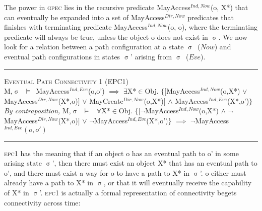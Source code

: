 \documentclass[a4paper,11pt, twoside,twocolumn]{article}
\newenvironment{logic}[1][]
{\begin{flushleft} \small }
{\end{flushleft}}
\newcommand{\loin}{$\in$}
\newcommand{\loforall}{$\forall$}
\newcommand{\loexists}{$\exists$}
\newcommand{\loand}{$\land$}
\newcommand{\loor} {$\lor$}
\newcommand{\loimplies}{$\implies$}
\newcommand{\losigma}{$\upsigma$}
\newcommand{\loturns} {$\vDash$}
\newcommand{\loneg}{$\boldsymbol \neg$}
\newcommand{\ablock} {\null\qquad}
\begin{document}
The power in \textsc{gpec} lies in the recursive predicate MayAccess$^{Ind,Now}$(o, X*) that can eventually be expanded into a set of MayAccess$^{Dir,Now}$ predicates that finishes with terminating predicate MayAccess$^{Ind,Now}$(o, o), where the terminating predicate will always be true, unless the object o does not exist in \losigma.
We now look for a relation between a path configuration at a state \losigma\ ($Now$) and eventual path configurations in states \losigma' arising from \losigma\ ($Eve$).\vfill
\begin{minipage}[b]{\linewidth}
\begin{logic}
\hrule\null
\textsc{\normalsize *Eventual Path Connectivity 1 (EPC1)}\\
M,\losigma\ \loturns\ MayAccess$^{Ind,Eve}$(o,o')\linebreak
\ablock \loimplies\linebreak
\ablock \loexists X*\loin Obj. $\{[$MayAccess$^{Ind,Now}$(o,X*)\linebreak
\ablock \ablock \ablock \ablock\loor \linebreak
\ablock \ablock \ablock \quad\: MayAccess$^{Dir,Now}$(X*,o)$]$\linebreak
\ablock \ablock \ablock \ablock\loor \linebreak
\ablock \ablock \ablock \quad\: MayCreate$^{Dir,Now}$(o,X*)$]$\linebreak
\ablock \ablock \ablock \quad \loand \linebreak
\ablock \ablock \ablock \quad MayAccess$^{Ind,Eve}$(X*,o')$\}$
\linebreak \\
\textit{By contraposition,}\linebreak
M,\losigma\ \loturns\ \linebreak
\ablock \loforall X*\loin Obj. $\{[$\loneg MayAccess$^{Ind,Now}$(o,X*)\linebreak
\ablock \ablock \ablock \ablock \quad \loand \linebreak
\ablock \ablock \ablock \quad\: \loneg MayAccess$^{Dir,Now}$(X*,o)$]$\linebreak
\ablock \ablock \ablock \quad \loor \linebreak
\ablock \ablock \ablock \quad \loneg MayAccess$^{Ind,Eve}$(X*,o')$\}$\linebreak
\ablock \loimplies\linebreak
	\ablock\loneg MayAccess$^{Ind,Eve}(o,o')$\linebreak
\hrule
\end{logic}
\end{minipage}
\textsc{epc1} has the meaning that if an object o has an eventual path to o' in some arising state \losigma', then there must exist an object X* that has an eventual path to o', and there must exist a way for o to have a path to X* in \losigma'. o either must already have a path to X* in \losigma, or that it will eventually receive the capability of X* in \losigma'. \textsc{epc1} is actually a formal representation of connectivity begets connectivity across time:
\end{document}
